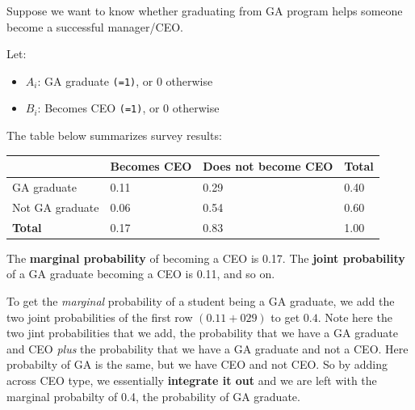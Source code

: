 \documentclass[
  letterpaper,
  DIV=11,
  numbers=noendperiod]{scrreprt}
\providecommand{\tightlist}{%
  \setlength{\itemsep}{0pt}\setlength{\parskip}{0pt}}
\begin{document}
Suppose we want to know whether graduating from GA program helps someone
become a successful manager/CEO.

Let:

\begin{itemize}
\tightlist
\item
  \(A_i\): GA graduate \texttt{(=1)}, or 0 otherwise\\
\item
  \(B_i\): Becomes CEO \texttt{(=1)}, or 0 otherwise
\end{itemize}

The table below summarizes survey results:

\begin{longtable}[]{@{}llll@{}}
\toprule\noalign{}
& Becomes CEO & Does not become CEO & \textbf{Total} \\
\midrule\noalign{}
\endhead
\bottomrule\noalign{}
\endlastfoot
GA graduate & 0.11 & 0.29 & 0.40 \\
Not GA graduate & 0.06 & 0.54 & 0.60 \\
\textbf{Total} & 0.17 & 0.83 & 1.00 \\
\end{longtable}

The \textbf{marginal probability} of becoming a CEO is 0.17. The
\textbf{joint probability} of a GA graduate becoming a CEO is 0.11, and
so on.

\begin{tcolorbox}[enhanced jigsaw, coltitle=black, colbacktitle=quarto-callout-important-color!10!white, left=2mm, bottomrule=.15mm, bottomtitle=1mm, colback=white, titlerule=0mm, colframe=quarto-callout-important-color-frame, breakable, leftrule=.75mm, toptitle=1mm, opacitybacktitle=0.6, rightrule=.15mm, title=\textcolor{quarto-callout-important-color}{\faExclamation}\hspace{0.5em}{Marginal probability from joint probabilities}, arc=.35mm, opacityback=0, toprule=.15mm]

To get the \emph{marginal} probability of a student being a GA graduate,
we add the two joint probabilities of the first row \((0.11 + 029)\) to
get \(0.4\). Note here the two jint probabilities that we add, the
probability that we have a GA graduate and CEO \emph{plus} the
probability that we have a GA graduate and not a CEO. Here probabilty of
GA is the same, but we have CEO and not CEO. So by adding across CEO
type, we essentially \textbf{integrate it out} and we are left with the
marginal probabilty of 0.4, the probability of GA graduate.

\end{tcolorbox}
\end{document}

